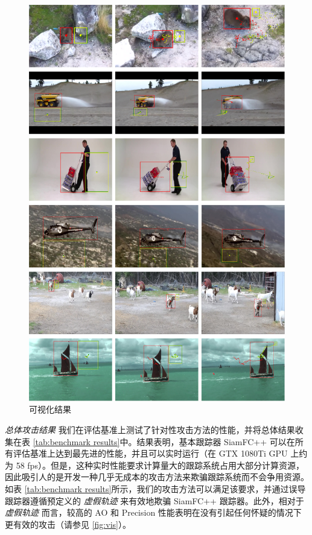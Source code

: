 \begin{figure}
\centering
\includegraphics[width=1.0\textwidth]{Img/attack/txt_visualize.pdf}
\caption{可视化结果}
\end{figure}

\textit{总体攻击结果} 我们在评估基准上测试了针对性攻击方法的性能，并将总体结果收集在表 \ref{tab:benchmark results}中。结果表明，基本跟踪器 SiamFC++ 可以在所有评估基准上达到最先进的性能，并且可以实时运行（在 GTX 1080Ti GPU 上约为 58 fps）。但是，这种实时性能要求计算量大的跟踪系统占用大部分计算资源，因此吸引人的是开发一种几乎无成本的攻击方法来欺骗跟踪系统而不会争用资源。如表 \ref{tab:benchmark results}所示，我们的攻击方法可以满足该要求，并通过误导跟踪器遵循预定义的 \textit{虚假轨迹} 来有效地欺骗 SiamFC++ 跟踪器。此外，相对于 \textit{虚假轨迹} 而言，较高的 AO 和 Precision 性能表明在没有引起任何怀疑的情况下更有效的攻击（请参见 \ref{fig:vis}）。

